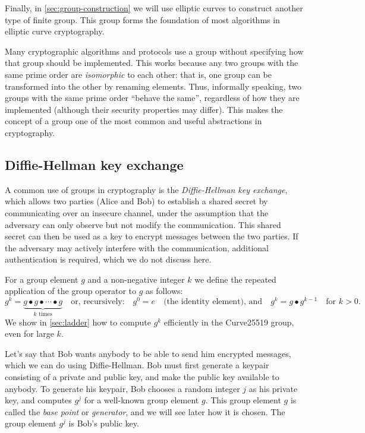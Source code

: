 \documentclass[manuscript]{acmart}
\begin{document}
Finally, in \autoref{sec:group-construction} we will use elliptic curves to construct another type of finite group.
This group forms the foundation of most algorithms in elliptic curve cryptography.

Many cryptographic algorithms and protocols use a group without specifying how that group should be implemented.
This works because any two groups with the same prime order are \emph{isomorphic} to each other: that is, one group can be transformed into the other by renaming elements.
Thus, informally speaking, two groups with the same prime order ``behave the same'', regardless of how they are implemented (although their security properties may differ).
This makes the concept of a group one of the most common and useful abstractions in cryptography.

\subsection{Diffie-Hellman key exchange}\label{sec:diffie-hellman}

A common use of groups in cryptography is the \emph{Diffie-Hellman key exchange}, which allows two parties (Alice and Bob) to establish a shared secret by communicating over an insecure channel, under the assumption that the adversary can only observe but not modify the communication.
This shared secret can then be used as a key to encrypt messages between the two parties.
If the adversary may actively interfere with the communication, additional authentication is required, which we do not discuss here.

For a group element $g$ and a non-negative integer $k$ we define the repeated application of the group operator to $g$ as follows:
\begin{equation}\label{eq:power}
    g^k = \underbrace{g \bullet g \bullet \cdots \bullet g}_\text{$k$ times} \quad\text{or, recursively:}\quad
    g^0 = e \quad\text{(the identity element), and}\quad g^k = g \bullet g^{k-1} \quad\text{for } k>0.
\end{equation}
We show in \autoref{sec:ladder} how to compute $g^k$ efficiently in the Curve25519 group, even for large $k$.

Let's say that Bob wants anybody to be able to send him encrypted messages, which we can do using Diffie-Hellman.
Bob must first generate a keypair consisting of a private and public key, and make the public key available to anybody.
To generate his keypair, Bob chooses a random integer $j$ as his private key, and computes $g^j$ for a well-known group element $g$.
This group element $g$ is called the \emph{base point} or \emph{generator}, and we will see later how it is chosen.
The group element $g^j$ is Bob's public key.
\end{document}
